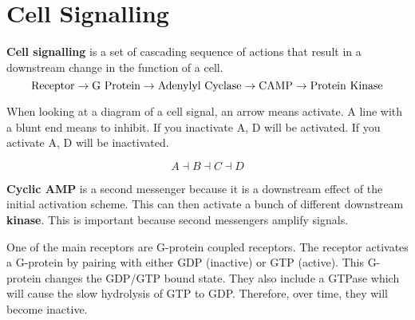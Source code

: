 \documentclass{article}
\begin{document}
\section{Cell Signalling}

\textbf{Cell signalling} is a set of cascading sequence of actions that result
in a downstream change in the function of a cell.
$$\rm{Receptor \rightarrow G\ Protein \rightarrow Adenylyl\ Cyclase \rightarrow
CAMP \rightarrow Protein\ Kinase}$$

When looking at a diagram of a cell signal, an arrow means activate. A line with
a blunt end means to inhibit. If you inactivate A, D will be activated. If you
activate A, D will be inactivated.

$$A \dashv B \dashv C \dashv D$$

\textbf{Cyclic AMP} is a second messenger because it is a downstream effect of
the initial activation scheme. This can then activate a bunch of different
downstream \textbf{kinase}. This is important because second messengers amplify
signals.

One of the main receptors are G-protein coupled receptors. The receptor
activates a G-protein by pairing with either GDP (inactive) or GTP (active).
This G-protein changes the GDP/GTP bound state. They also include a GTPase which
will cause the slow hydrolysis of GTP to GDP. Therefore, over time, they will
become inactive.
\end{document}
